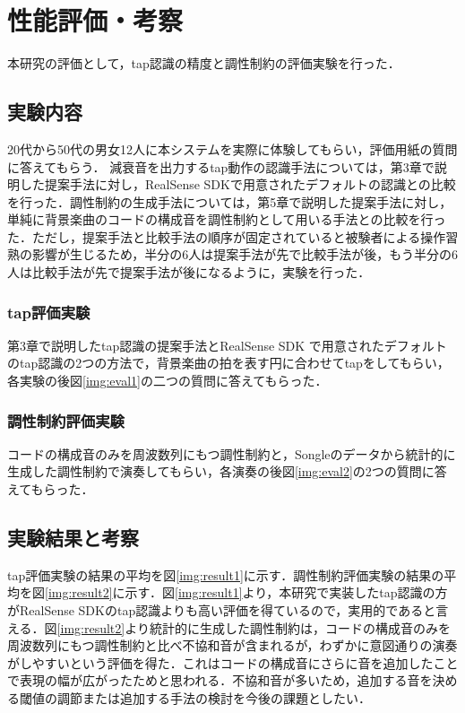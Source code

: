 \chapter{性能評価・考察}
本研究の評価として，tap認識の精度と調性制約の評価実験を行った．
\section{実験内容}
20代から50代の男女12人に本システムを実際に体験してもらい，評価用紙の質問に答えてもらう．
減衰音を出力するtap動作の認識手法については，第3章で説明した提案手法に対し，RealSense SDKで用意されたデフォルトの認識との比較を行った．調性制約の生成手法については，第5章で説明した提案手法に対し，単純に背景楽曲のコードの構成音を調性制約として用いる手法との比較を行った．ただし，提案手法と比較手法の順序が固定されていると被験者による操作習熟の影響が生じるため，半分の6人は提案手法が先で比較手法が後，もう半分の6人は比較手法が先で提案手法が後になるように，実験を行った．
\subsection{tap評価実験}
第3章で説明したtap認識の提案手法とRealSense SDK で用意されたデフォルトのtap認識の2つの方法で，背景楽曲の拍を表す円に合わせてtapをしてもらい，各実験の後図\ref{img:eval1}の二つの質問に答えてもらった．

\subsection{調性制約評価実験}
コードの構成音のみを周波数列にもつ調性制約と，Songleのデータから統計的に生成した調性制約で演奏してもらい，各演奏の後図\ref{img:eval2}の2つの質問に答えてもらった．

\section{実験結果と考察}
tap評価実験の結果の平均を図\ref{img:result1}に示す．調性制約評価実験の結果の平均を図\ref{img:result2}に示す．図\ref{img:result1}より，本研究で実装したtap認識の方がRealSense SDKのtap認識よりも高い評価を得ているので，実用的であると言える．図\ref{img:result2}より統計的に生成した調性制約は，コードの構成音のみを周波数列にもつ調性制約と比べ不協和音が含まれるが，わずかに意図通りの演奏がしやすいという評価を得た．これはコードの構成音にさらに音を追加したことで表現の幅が広がったためと思われる．不協和音が多いため，追加する音を決める閾値の調節または追加する手法の検討を今後の課題としたい．
